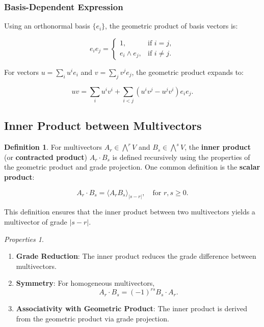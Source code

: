 \documentclass[a4paper,14pt]{article}
\renewcommand{\geq}{\ensuremath{\geqslant}}
\theoremstyle{plain} %
\theoremstyle{definition} %
\theoremstyle{remark} %
\theoremstyle{definition}
\newtheorem{definition}{Definition}[section]
\theoremstyle{remark}
\newtheorem*{properties}{Properties}
\theoremstyle{remark}
\begin{document}
	\subsubsection{Basis-Dependent Expression}
	
	Using an orthonormal basis \( \{ e_i \} \), the geometric product of basis vectors is:
	
	\[
	e_i e_j = 
	\begin{cases}
		1, & \text{if } i = j, \\
		e_i \wedge e_j, & \text{if } i \neq j.
	\end{cases}
	\]
	
	For vectors \( u = \sum_{i} u^i e_i \) and \( v = \sum_{j} v^j e_j \), the geometric product expands to:
	
	\[
	u v = \sum_{i} u^i v^i + \sum_{i < j} (u^i v^j - u^j v^i) e_i e_j.
	\]
	
	\subsection{Inner Product between Multivectors}
	
	\begin{definition}
		For multivectors \( A_r \in \bigwedge^r V \) and \( B_s \in \bigwedge^s V \), the \textbf{inner product} (or \textbf{contracted product}) \( A_r \cdot B_s \) is defined recursively using the properties of the geometric product and grade projection. One common definition is the \textbf{scalar product}:
		
		\[
		A_r \cdot B_s = \langle A_r B_s \rangle_{|s - r|}, \quad \text{for } r, s \geq 0.
		\]
		
		This definition ensures that the inner product between two multivectors yields a multivector of grade \( |s - r| \).
		
	\end{definition}
	
	\begin{properties}
		\begin{enumerate}
			\item \textbf{Grade Reduction}:
			The inner product reduces the grade difference between multivectors.
			\item \textbf{Symmetry}:
			For homogeneous multivectors,
			\[
			A_r \cdot B_s = (-1)^{r s} B_s \cdot A_r.
			\]
			\item \textbf{Associativity with Geometric Product}:
			The inner product is derived from the geometric product via grade projection.
		\end{enumerate}
	\end{properties}
	
\end{document}
